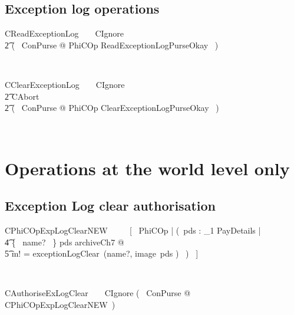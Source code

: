 \subsection{Exception log operations}

\begin{LSDef}
\begin{zed}
  CReadExceptionLog~~~~CIgnore
  \\ \t2           \lor (~ \exists \Delta ConPurse @
  PhiCOp \land ReadExceptionLogPurseOkay ~)
\end{zed}~\end{LSDef}

\begin{LSDef}
\begin{zed}
  CClearExceptionLog~~~~CIgnore
  \\ \t2          \lor CAbort
  \\ \t2          \lor (~ \exists \Delta ConPurse @
  PhiCOp \land ClearExceptionLogPurseOkay ~)
\end{zed}~\end{LSDef}

\section{Operations at the world level only}

\subsection{Exception Log clear authorisation}

\begin{LNewSDef}
\begin{zed}
   CPhiCOpExpLogClearNEW ~~~~ [~ PhiCOp |
  (~\exists pds : \power_1 PayDetails |
  \\ \t4                          \{~ name? ~\} \cross pds \subseteq archiveCh7 @
  \\ \t5                                  m! = exceptionLogClear~(name?, image~pds ) ~)
  ~]
\end{zed}~\end{LNewSDef}

\begin{LSDef}
\begin{zed}
  CAuthoriseExLogClear~~~~CIgnore \lor (~ \exists \Xi ConPurse @ CPhiCOpExpLogClearNEW~)
\end{zed}~\end{LSDef}

